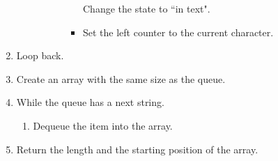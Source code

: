 \documentclass{article}
\begin{document}
\begin{enumerate}
\begin{enumerate}
\begin{enumerate}
\begin{enumerate}
\begin{itemize}
                                                Change the state to ``in text".
                                            \item
                                                Set the left counter to the current character.
                                        \end{itemize}
                            \end{enumerate}
                \end{enumerate}
        \end{enumerate}
    \item
        Loop back.
    \item
        Create an array with the same size as the queue.
    \item
        While the queue has a next string.
        \begin{enumerate}
            \item
                Dequeue the item into the array.
        \end{enumerate}
    \item
        Return the length and the starting position of the array.
\end{enumerate}
\end{document}
